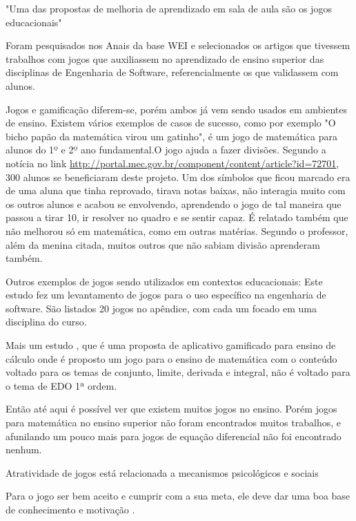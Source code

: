 "Uma das propostas de melhoria de aprendizado em sala de aula são os jogos educacionais" \cite[p. 4]{sucessoJogoEngSoft}

\begin{citacao}
Foram pesquisados nos Anais da base WEI e selecionados os artigos que tivessem trabalhos com jogos que auxiliassem no aprendizado de ensino superior das disciplinas de Engenharia de Software, referencialmente os que validassem com alunos. \cite{sucessoJogoEngSoft}
\end{citacao}

Jogos e gamificação diferem-se, porém ambos já vem sendo usados em ambientes de ensino. 
Existem vários exemplos de casos de sucesso, como por exemplo "O bicho papão da matemática virou um gatinho", é um jogo de matemática para alunos do 1º e 2º ano fundamental.O jogo ajuda a fazer divisões. Segundo a notícia no link \url{http://portal.mec.gov.br/component/content/article?id=72701}, 300 alunos se beneficiaram deste projeto. Um dos símbolos que ficou marcado era de uma aluna que tinha reprovado, tirava notas baixas, não interagia muito com os outros alunos e acabou se envolvendo, aprendendo o jogo de tal maneira que passou a tirar 10, ir resolver no quadro e se sentir capaz. É relatado também que não melhorou só em matemática, como em outras matérias. Segundo o professor, além da menina citada, muitos outros que não sabiam divisão aprenderam também.

Outros exemplos de jogos sendo utilizados em contextos educacionais: Este estudo \cite{sucessoJogoEngSoft} fez um levantamento de jogos para o uso específico na engenharia de software. São listados 20 jogos no apêndice, com cada um focado em uma disciplina do curso. 

Mais um estudo \cite{appcalculo}, que é uma proposta de aplicativo gamificado para ensino de cálculo onde é proposto um jogo para o ensino de matemática com o conteúdo voltado para os temas de  conjunto, limite, derivada e integral, não é voltado para o tema de EDO 1ª ordem.

Então até aqui é possível ver que existem muitos jogos no ensino. Porém jogos para matemática no ensino superior não foram encontrados muitos trabalhos, e afunilando um pouco mais para jogos de equação diferencial não foi encontrado nenhum.

Atratividade de jogos está relacionada a mecanismos psicológicos e sociais \cite{sucessoJogoEngSoft}

Para o jogo ser bem aceito e cumprir com a sua meta, ele deve dar uma boa base de conhecimento e motivação \cite{sucessoJogoEngSoft}.

